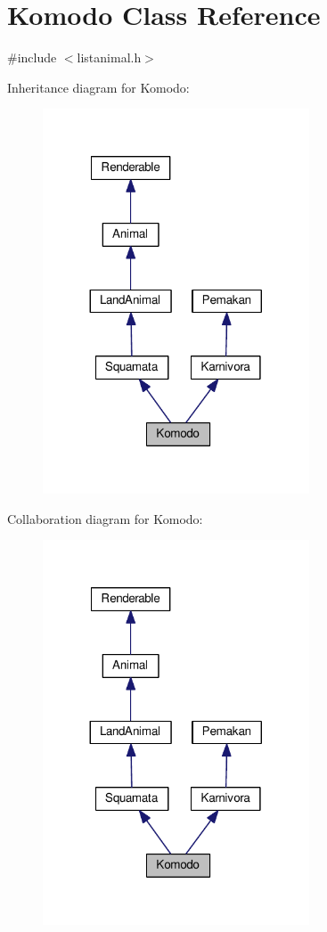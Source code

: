 \hypertarget{classKomodo}{}\section{Komodo Class Reference}
\label{classKomodo}


{\ttfamily \#include $<$listanimal.\+h$>$}



Inheritance diagram for Komodo\+:
\nopagebreak
\begin{figure}[H]
\begin{center}
\leavevmode
\includegraphics[width=224pt]{classKomodo__inherit__graph}
\end{center}
\end{figure}


Collaboration diagram for Komodo\+:
\nopagebreak
\begin{figure}[H]
\begin{center}
\leavevmode
\includegraphics[width=224pt]{classKomodo__coll__graph}
\end{center}
\end{figure}
